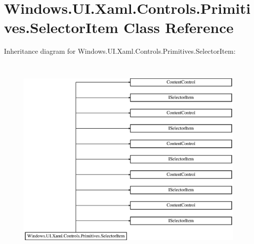 \hypertarget{class_windows_1_1_u_i_1_1_xaml_1_1_controls_1_1_primitives_1_1_selector_item}{}\section{Windows.\+U\+I.\+Xaml.\+Controls.\+Primitives.\+Selector\+Item Class Reference}
\label{class_windows_1_1_u_i_1_1_xaml_1_1_controls_1_1_primitives_1_1_selector_item}
Inheritance diagram for Windows.\+U\+I.\+Xaml.\+Controls.\+Primitives.\+Selector\+Item\+:\begin{figure}[H]
\begin{center}
\leavevmode
\includegraphics[height=10.301003cm]{class_windows_1_1_u_i_1_1_xaml_1_1_controls_1_1_primitives_1_1_selector_item}
\end{center}
\end{figure}
